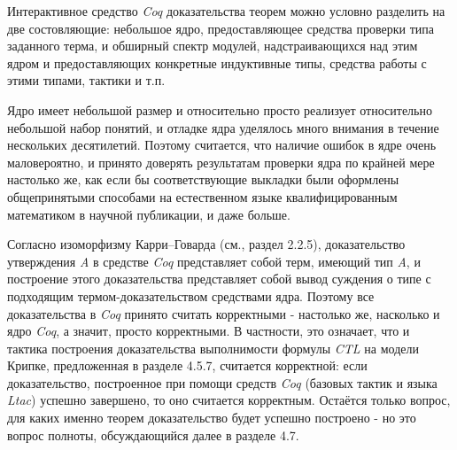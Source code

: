 \documentclass[12pt]{article}
\begin{document}

Интерактивное средство \textit{Coq} доказательства теорем можно условно разделить на две состовляющие: небольшое ядро, предоставляющее средства проверки типа заданного терма, и обширный спектр модулей, надстраивающихся над этим ядром и предоставляющих конкретные индуктивные типы, средства работы с этими типами, тактики и т.п.

Ядро имеет небольшой размер и относительно просто реализует относительно небольшой набор понятий, и отладке ядра уделялось много внимания в течение нескольких десятилетий.
Поэтому считается, что наличие ошибок в ядре очень маловероятно, и принято доверять результатам проверки ядра по крайней мере настолько же, как если бы соответствующие выкладки были оформлены общепринятыми способами на естественном языке квалифицированным математиком в научной публикации, и даже больше\cite{CoqCorrect}.

Согласно изоморфизму Карри--Говарда (см., раздел 2.2.5), доказательство утверждения \textit{A} в средстве \textit{Coq} представляет собой терм, имеющий тип \textit{A}, и построение этого доказательства представляет собой вывод суждения о типе с подходящим термом-доказательством средствами ядра\cite{CHC}.
Поэтому все доказательства в \textit{Coq} принято считать корректными - настолько же, насколько и ядро \textit{Coq}, а значит, просто корректными.
В частности, это означает, что и тактика построения доказательства выполнимости формулы \textit{CTL} на модели Крипке, предложенная в разделе 4.5.7, считается корректной: если доказательство, построенное при помощи средств \textit{Coq} (базовых тактик и языка \textit{Ltac}) успешно завершено, то оно считается корректным.
Остаётся только вопрос, для каких именно теорем доказательство будет успешно построено - но это вопрос полноты, обсуждающийся далее в разделе 4.7.





\end{document}
